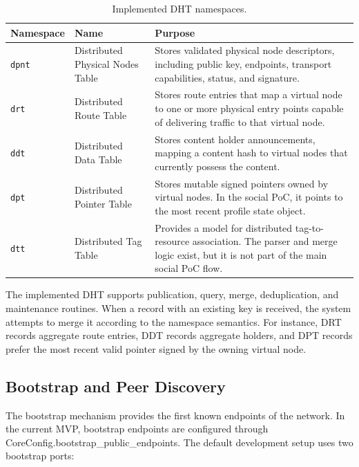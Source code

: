 \documentclass[12pt,a4paper]{article}
\newcommand{\codebreak}[1]{{\footnotesize\ttfamily #1}}
\begin{document}
\begin{table}[H]
\centering
\caption{Implemented DHT namespaces.}
\label{tab:dht-namespaces-implementation}
\begin{tabularx}{\textwidth}{L{0.15\textwidth} L{0.24\textwidth} Y}
\toprule
\textbf{Namespace} & \textbf{Name} & \textbf{Purpose} \\
\midrule
\texttt{dpnt} & Distributed Physical Nodes Table & Stores validated physical node descriptors, including public key, endpoints, transport capabilities, status, and signature. \\
\texttt{drt} & Distributed Route Table & Stores route entries that map a virtual node to one or more physical entry points capable of delivering traffic to that virtual node. \\
\texttt{ddt} & Distributed Data Table & Stores content holder announcements, mapping a content hash to virtual nodes that currently possess the content. \\
\texttt{dpt} & Distributed Pointer Table & Stores mutable signed pointers owned by virtual nodes. In the social PoC, it points to the most recent profile state object. \\
\texttt{dtt} & Distributed Tag Table & Provides a model for distributed tag-to-resource association. The parser and merge logic exist, but it is not part of the main social PoC flow. \\
\bottomrule
\end{tabularx}
\end{table}

The implemented DHT supports publication, query, merge, deduplication, and maintenance routines. When a record with an existing key is received, the system attempts to merge it according to the namespace semantics. For instance, DRT records aggregate route entries, DDT records aggregate holders, and DPT records prefer the most recent valid pointer signed by the owning virtual node.

\subsection{Bootstrap and Peer Discovery}
\label{sec:bootstrap-peer-discovery}

The bootstrap mechanism provides the first known endpoints of the network. In the current MVP, bootstrap endpoints are configured through \codebreak{CoreConfig.bootstrap\_\allowbreak{}public\_\allowbreak{}endpoints}. The default development setup uses two bootstrap ports:
\end{document}
